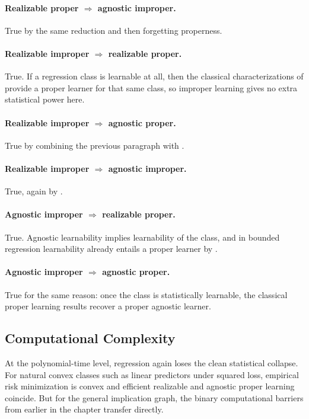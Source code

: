 \paragraph{Realizable proper $\Rightarrow$ agnostic improper.}
True by the same reduction and then forgetting properness.

\paragraph{Realizable improper $\Rightarrow$ realizable proper.}
True. If a regression class is learnable at all, then the classical characterizations of \citet{bartlett1996, alon1997} provide a proper learner for that same class, so improper learning gives no extra statistical power here.

\paragraph{Realizable improper $\Rightarrow$ agnostic proper.}
True by combining the previous paragraph with \citet{hopkins2024}.

\paragraph{Realizable improper $\Rightarrow$ agnostic improper.}
True, again by \citet{hopkins2024}.

\paragraph{Agnostic improper $\Rightarrow$ realizable proper.}
True. Agnostic learnability implies learnability of the class, and in bounded regression learnability already entails a proper learner by \citet{bartlett1996, alon1997}.

\paragraph{Agnostic improper $\Rightarrow$ agnostic proper.}
True for the same reason: once the class is statistically learnable, the classical proper learning results recover a proper agnostic learner.

\subsection{Computational Complexity}

At the polynomial-time level, regression again loses the clean statistical collapse. For natural convex classes such as linear predictors under squared loss, empirical risk minimization is convex and efficient realizable and agnostic proper learning coincide. But for the general implication graph, the binary computational barriers from earlier in the chapter transfer directly.

